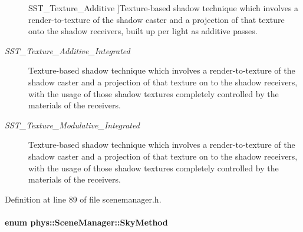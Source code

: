 \begin{Desc}
\begin{description}
{\hypertarget{classphys_1_1SceneManager_a427f1bbb52c11ad07352ae01d8b3c746af9aba631cfa4181d30d83fa8c2bd71de}{
SST\_\-Texture\_\-Additive}
\label{classphys_1_1SceneManager_a427f1bbb52c11ad07352ae01d8b3c746af9aba631cfa4181d30d83fa8c2bd71de}
}]Texture-\/based shadow technique which involves a render-\/to-\/texture of the shadow caster and a projection of that texture onto the shadow receivers, built up per light as additive passes. \item[{\em 
\hypertarget{classphys_1_1SceneManager_a427f1bbb52c11ad07352ae01d8b3c746a2cb2c18049fd6f062db3a25e45aa9a16}{
SST\_\-Texture\_\-Additive\_\-Integrated}
\label{classphys_1_1SceneManager_a427f1bbb52c11ad07352ae01d8b3c746a2cb2c18049fd6f062db3a25e45aa9a16}
}]Texture-\/based shadow technique which involves a render-\/to-\/texture of the shadow caster and a projection of that texture on to the shadow receivers, with the usage of those shadow textures completely controlled by the materials of the receivers. \item[{\em 
\hypertarget{classphys_1_1SceneManager_a427f1bbb52c11ad07352ae01d8b3c746a85419a12cb66f84865d9c0e50503af8c}{
SST\_\-Texture\_\-Modulative\_\-Integrated}
\label{classphys_1_1SceneManager_a427f1bbb52c11ad07352ae01d8b3c746a85419a12cb66f84865d9c0e50503af8c}
}]Texture-\/based shadow technique which involves a render-\/to-\/texture of the shadow caster and a projection of that texture on to the shadow receivers, with the usage of those shadow textures completely controlled by the materials of the receivers. \end{description}
\end{Desc}



Definition at line 89 of file scenemanager.h.

\hypertarget{classphys_1_1SceneManager_a91dd086aabaab926d070c65fc14828d6}{
\paragraph[{SkyMethod}]{\setlength{\rightskip}{0pt plus 5cm}enum {\bf phys::SceneManager::SkyMethod}}\hfill}
\label{classphys_1_1SceneManager_a91dd086aabaab926d070c65fc14828d6}


